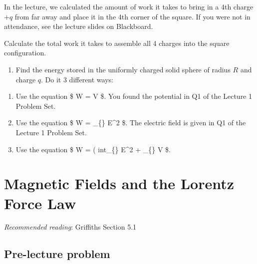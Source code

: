 \documentclass[
  letterpaper,
  DIV=11,
  numbers=noendperiod]{scrreprt}
\providecommand{\tightlist}{%
  \setlength{\itemsep}{0pt}\setlength{\parskip}{0pt}}\usepackage{longtable,booktabs,array}
\begin{document}
In the lecture, we calculated the amount of work it takes to bring in a
4th charge \(+q\) from far away and place it in the 4th corner of the
square. If you were not in attendance, see the lecture slides on
Blackboard.

Calculate the total work it takes to assemble all 4 charges into the
square configuration.

\begin{enumerate}
\def\labelenumi{\arabic{enumi})}
\setcounter{enumi}{1}
\tightlist
\item
  Find the energy stored in the uniformly charged solid sphere of radius
  \(R\) and charge \(q\). Do it 3 different ways:
\end{enumerate}

\begin{enumerate}
\def\labelenumi{(\alph{enumi})}
\item
  Use the equation \$ W =  \int \rho V  \tau \$.
  You found the potential in Q1 of the Lecture 1 Problem Set.
\item
  Use the equation \$ W = 
  \int\_\{\} E\^{}2  \tau \$. The electric
  field is given in Q1 of the Lecture 1 Problem Set.
\item
  Use the equation \$ W =  \left(
  int\_\{\} E\^{}2  \tau + \oint\_\{\} V
   \cdot {}  \$.
\end{enumerate}


\chapter{Magnetic Fields and the Lorentz Force
Law}\label{magnetic-fields-and-the-lorentz-force-law}

\newcommand{\l}{\mathrm{\mathbf{l}}}
\newcommand{\E}{\mathrm{\mathbf{E}}}
\newcommand{\F}{\mathrm{\mathbf{F}}}
\newcommand{\r}{\mathrm{\mathbf{r}}}
\newcommand{\B}{\mathrm{\mathbf{B}}}
\newcommand{\x}{\mathrm{\mathbf{x}}}
\newcommand{\y}{\mathrm{\mathbf{y}}}
\newcommand{\z}{\mathrm{\mathbf{z}}}
\newcommand{\v}{\mathrm{\mathbf{v}}}

\newcommand{\a}{\mathrm{\mathbf{a}}}
\newcommand{\b}{\mathrm{\mathbf{b}}}

\emph{Recommended reading}: Griffiths Section 5.1

\section{Pre-lecture problem}\label{pre-lecture-problem-2}
\end{document}
